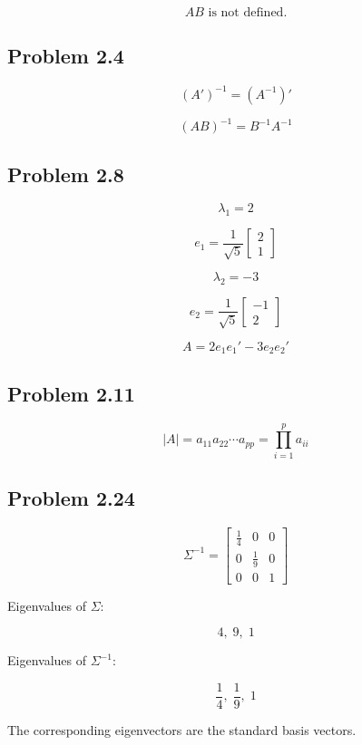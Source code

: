 \documentclass[12pt]{article}
\begin{document}
\[
\boxed{\text{$AB$ is not defined.}}
\]

\subsection*{Problem 2.4}

\[
\boxed{
(A')^{-1}=(A^{-1})'
}
\]

\[
\boxed{
(AB)^{-1}=B^{-1}A^{-1}
}
\]

\subsection*{Problem 2.8}

\[
\boxed{\lambda_1=2}
\]

\[
\boxed{
e_1=
\frac{1}{\sqrt5}
\begin{bmatrix}
2\\1
\end{bmatrix}}
\]

\[
\boxed{\lambda_2=-3}
\]

\[
\boxed{
e_2=
\frac{1}{\sqrt5}
\begin{bmatrix}
-1\\2
\end{bmatrix}}
\]

\[
\boxed{
A=2e_1e_1'-3e_2e_2'
}
\]

\subsection*{Problem 2.11}

\[
\boxed{
|A|
=
a_{11}a_{22}\cdots a_{pp}
=
\prod_{i=1}^{p}a_{ii}
}
\]

\subsection*{Problem 2.24}

\[
\boxed{
\Sigma^{-1}
=
\begin{bmatrix}
\frac14&0&0\\
0&\frac19&0\\
0&0&1
\end{bmatrix}}
\]

Eigenvalues of $\Sigma$:

\[
\boxed{4,\;9,\;1}
\]

Eigenvalues of $\Sigma^{-1}$:

\[
\boxed{\frac14,\;\frac19,\;1}
\]

The corresponding eigenvectors are the standard basis vectors.
\end{document}
